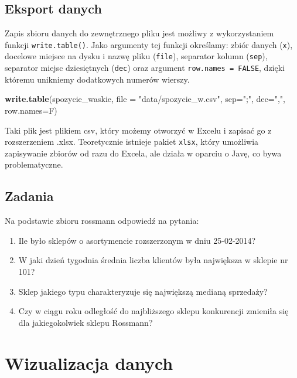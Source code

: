 \documentclass[]{book}
\newenvironment{Shaded}{\begin{snugshade}}{\end{snugshade}}
\newcommand{\KeywordTok}[1]{\textcolor[rgb]{0.13,0.29,0.53}{\textbf{#1}}}
\newcommand{\DataTypeTok}[1]{\textcolor[rgb]{0.13,0.29,0.53}{#1}}
\newcommand{\StringTok}[1]{\textcolor[rgb]{0.31,0.60,0.02}{#1}}
\newcommand{\NormalTok}[1]{#1}
\providecommand{\tightlist}{%
  \setlength{\itemsep}{0pt}\setlength{\parskip}{0pt}}
\begin{document}
\section{Eksport danych}\label{eksport-danych}

Zapis zbioru danych do zewnętrznego pliku jest możliwy z wykorzystaniem
funkcji \texttt{write.table()}. Jako argumenty tej funkcji określamy:
zbiór danych (\texttt{x}), docelowe miejsce na dysku i nazwę pliku
(\texttt{file}), separator kolumn (\texttt{sep}), separator miejsc
dziesiętnych (\texttt{dec}) oraz argument \texttt{row.names\ =\ FALSE},
dzięki któremu unikniemy dodatkowych numerów wierszy.

\begin{Shaded}
\begin{Highlighting}[]
\KeywordTok{write.table}\NormalTok{(spozycie_waskie, }\DataTypeTok{file =} \StringTok{"data/spozycie_w.csv"}\NormalTok{, }\DataTypeTok{sep=}\StringTok{";"}\NormalTok{, }\DataTypeTok{dec=}\StringTok{","}\NormalTok{, }\DataTypeTok{row.names=}\NormalTok{F)}
\end{Highlighting}
\end{Shaded}

Taki plik jest plikiem csv, który możemy otworzyć w Excelu i zapisać go
z rozszerzeniem .xlsx. Teoretycznie istnieje pakiet \texttt{xlsx}, który
umożliwia zapisywanie zbiorów od razu do Excela, ale działa w oparciu o
Javę, co bywa problematyczne.

\section{Zadania}\label{zadania-2}

Na podstawie zbioru rossmann odpowiedź na pytania:

\begin{enumerate}
\def\labelenumi{\arabic{enumi}.}
\tightlist
\item
  Ile było sklepów o asortymencie rozszerzonym w dniu 25-02-2014?
\item
  W jaki dzień tygodnia średnia liczba klientów była największa w
  sklepie nr 101?
\item
  Sklep jakiego typu charakteryzuje się największą medianą sprzedaży?
\item
  Czy w ciągu roku odległość do najbliższego sklepu konkurencji zmieniła
  się dla jakiegokolwiek sklepu Rossmann?
\end{enumerate}

\chapter{Wizualizacja danych}\label{wizualizacja-danych}
\end{document}
